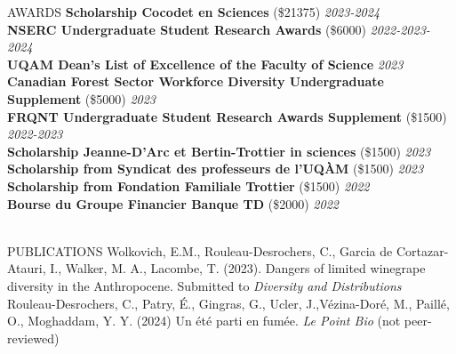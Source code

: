 \documentclass[
	11pt, %
]{resume} %
\begin{document}
\begin{rSection}{AWARDS}
	\textbf{Scholarship Cocodet en Sciences} (\$21375) 
	\hfill \textit{2023-2024} \\
	\textbf{NSERC Undergraduate Student Research Awards} (\$6000) 
	\hfill \textit{2022-2023-2024} \\ 
	\textbf{UQAM Dean’s List of Excellence of the Faculty of Science}  
	\hfill \textit{2023} \\ 
	\textbf{Canadian Forest Sector Workforce Diversity Undergraduate Supplement } (\$5000) 
	\hfill \textit{2023} \\ 
	\textbf{FRQNT Undergraduate Student Research Awards Supplement} (\$1500) 
	\hfill \textit{2022-2023} \\ 
	\textbf{Scholarship Jeanne-D'Arc et Bertin-Trottier in sciences} (\$1500) 
	\hfill \textit{2023} \\ 
	\textbf{Scholarship from Syndicat des professeurs de l'UQÀM} (\$1500) 
	\hfill \textit{2023} \\ 
	\textbf{Scholarship from Fondation Familiale Trottier} (\$1500) 
	\hfill \textit{2022} \\ 
	\textbf{Bourse du Groupe Financier Banque TD} (\$2000) 
	\hfill \textit{2022} \\ 
	\smallskip \\
\end{rSection}
\begin{rSection}{PUBLICATIONS}
Wolkovich, E.M., Rouleau-Desrochers, C., Garcia de Cortazar-Atauri, I., Walker, M. A., Lacombe, T. (2023). Dangers of limited winegrape diversity in the Anthropocene. Submitted to \textit{Diversity and Distributions}
	\smallskip \\
Rouleau-Desrochers, C., Patry, É., Gingras, G., Ucler, J.,Vézina-Doré, M., Paillé, O., Moghaddam, Y. Y. (2024) Un été parti en fumée. \textit{Le Point Bio} (not peer-reviewed)
\end{rSection}
\end{document}
